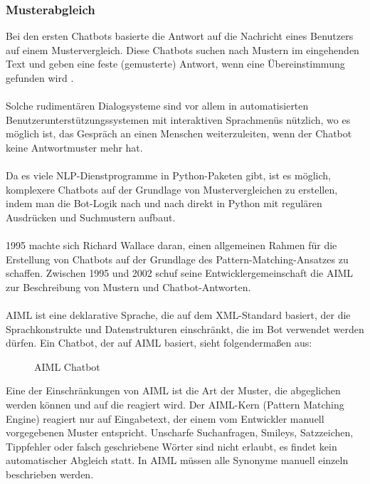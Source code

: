 \subsubsection{Musterabgleich}
Bei den ersten Chatbots basierte die Antwort auf die Nachricht eines Benutzers auf einem Mustervergleich. 
Diese Chatbots suchen nach Mustern im eingehenden Text und geben eine feste (gemusterte) Antwort, wenn eine Übereinstimmung gefunden wird \cite{woudenberg_chatbot_2014}.\\\\
Solche rudimentären Dialogsysteme sind vor allem in automatisierten Benutzerunterstützungssystemen mit interaktiven Sprachmenüs nützlich, wo es möglich ist, das Gespräch an einen Menschen weiterzuleiten, wenn der Chatbot keine Antwortmuster mehr hat.\\\\
Da es viele \ac{NLP}-Dienstprogramme in Python-Paketen gibt, ist es möglich, komplexere Chatbots auf der Grundlage von Mustervergleichen zu erstellen, indem man die Bot-Logik nach und nach direkt in Python mit regulären Ausdrücken und Suchmustern aufbaut.\\\\
1995 machte sich Richard Wallace daran, einen allgemeinen Rahmen für die Erstellung von Chatbots auf der Grundlage des Pattern-Matching-Ansatzes zu schaffen. Zwischen 1995 und 2002 schuf seine Entwicklergemeinschaft die \ac{AIML} zur Beschreibung von Mustern und Chatbot-Antworten.\\\\
\ac{AIML} ist eine deklarative Sprache, die auf dem \ac{XML}-Standard basiert, der die Sprachkonstrukte und Datenstrukturen einschränkt, die im Bot verwendet werden dürfen. \cite{noauthor_aiml_nodate}
Ein Chatbot, der auf \ac{AIML} basiert, sieht folgendermaßen aus:
\begin{figure}[H]
    \centering
    \caption{\label{figure:Aiml_Bot}\ac{AIML} Chatbot}
\end{figure}
\noindent
Eine der Einschränkungen von \ac{AIML} ist die Art der Muster, die abgeglichen werden können und auf die reagiert wird. 
Der \ac{AIML}-Kern (Pattern Matching Engine) reagiert nur auf Eingabetext, der einem vom Entwickler manuell vorgegebenen Muster entspricht. 
Unscharfe Suchanfragen, Smileys, Satzzeichen, Tippfehler oder falsch geschriebene Wörter sind nicht erlaubt, es findet kein automatischer Abgleich statt. 
In \ac{AIML} müssen alle Synonyme manuell einzeln beschrieben werden.
